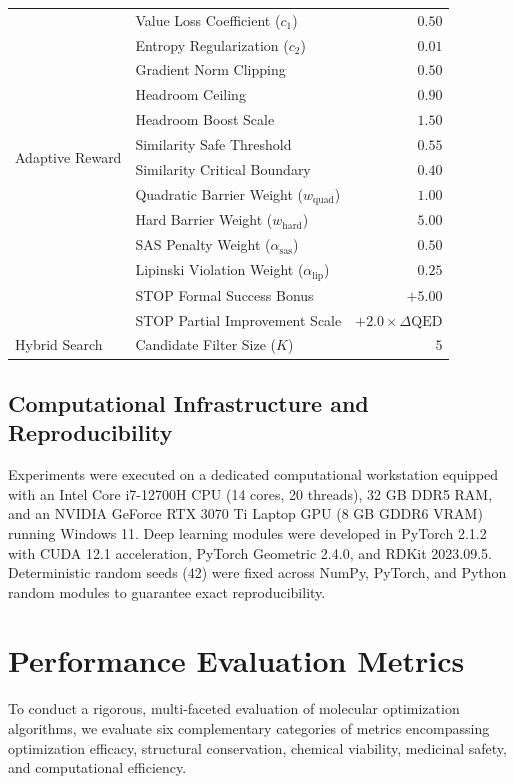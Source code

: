 \documentclass{ieeeaccess}
\begin{document}
\begin{table}[!tbp]
\begin{tabularx}{\columnwidth}{l l r}
 & Value Loss Coefficient ($c_1$) & $0.50$\\
 & Entropy Regularization ($c_2$) & $0.01$\\
 & Gradient Norm Clipping & $0.50$\\
\midrule
\multirow{6}{*}{Adaptive Reward} & Headroom Ceiling & $0.90$\\
 & Headroom Boost Scale & $1.50$\\
 & Similarity Safe Threshold & $0.55$\\
 & Similarity Critical Boundary & $0.40$\\
 & Quadratic Barrier Weight ($w_{\text{quad}}$) & $1.00$\\
 & Hard Barrier Weight ($w_{\text{hard}}$) & $5.00$\\
 & SAS Penalty Weight ($\alpha_{\text{sas}}$) & $0.50$\\
 & Lipinski Violation Weight ($\alpha_{\text{lip}}$) & $0.25$\\
 & STOP Formal Success Bonus & $+5.00$\\
 & STOP Partial Improvement Scale & $+2.0 \times \Delta\text{QED}$\\
\midrule
Hybrid Search & Candidate Filter Size ($K$) & $5$\\
\bottomrule
\end{tabularx}
\end{table}

\subsection{Computational Infrastructure and Reproducibility}
Experiments were executed on a dedicated computational workstation equipped with an Intel Core i7-12700H CPU (14 cores, 20 threads), 32 GB DDR5 RAM, and an NVIDIA GeForce RTX 3070 Ti Laptop GPU (8 GB GDDR6 VRAM) running Windows 11. Deep learning modules were developed in PyTorch 2.1.2 with CUDA 12.1 acceleration, PyTorch Geometric 2.4.0, and RDKit 2023.09.5. Deterministic random seeds ($42$) were fixed across NumPy, PyTorch, and Python random modules to guarantee exact reproducibility.


\section{Performance Evaluation Metrics}
\label{sec:metrics}
To conduct a rigorous, multi-faceted evaluation of molecular optimization algorithms, we evaluate six complementary categories of metrics encompassing optimization efficacy, structural conservation, chemical viability, medicinal safety, and computational efficiency.
\end{document}
